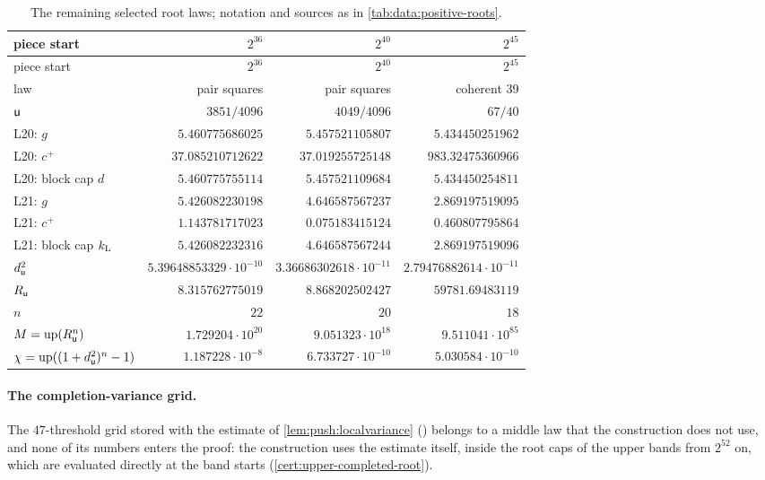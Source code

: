 {\scriptsize\setlength{\tabcolsep}{4pt}\renewcommand{\arraystretch}{0.95}
\begin{longtable}{@{}lrrr@{}}
\caption{The remaining selected root laws; notation and sources as in \cref{tab:data:positive-roots}.}\label{tab:data:positive-roots-late}\\
\toprule
piece start & $2^{36}$ & $2^{40}$ & $2^{45}$\\
\midrule\endfirsthead
\toprule
piece start & $2^{36}$ & $2^{40}$ & $2^{45}$\\
\midrule\endhead
\bottomrule\endfoot
law & pair squares & pair squares & coherent 39\\
$\mathsf u$ & $3851/4096$ & $4049/4096$ & $67/40$\\
L20: $g$ & $5.460775686025$ & $5.457521105807$ & $5.434450251962$\\
L20: $c^+$ & $37.085210712622$ & $37.019255725148$ & $983.32475360966$\\
L20: block cap $d$ & $5.460775755114$ & $5.457521109684$ & $5.434450254811$\\
L21: $g$ & $5.426082230198$ & $4.646587567237$ & $2.869197519095$\\
L21: $c^+$ & $1.143781717023$ & $0.075183415124$ & $0.460807795864$\\
L21: block cap $k_{\rm L}$ & $5.426082232316$ & $4.646587567244$ & $2.869197519096$\\
$d_\mathsf u^2$ & $5.39648853329\cdot10^{-10}$ & $3.36686302618\cdot10^{-11}$ & $2.79476882614\cdot10^{-11}$\\
$R_\mathsf u$ & $8.315762775019$ & $8.868202502427$ & $59781.69483119$\\
$n$ & $22$ & $20$ & $18$\\
$M=\operatorname{up}(R_\mathsf u^n)$ & $1.729204\cdot10^{20}$ & $9.051323\cdot10^{18}$ & $9.511041\cdot10^{85}$\\
$\chi=\operatorname{up}((1+d_\mathsf u^2)^n-1)$ & $1.187228\cdot10^{-8}$ & $6.733727\cdot10^{-10}$ & $5.030584\cdot10^{-10}$\\
\end{longtable}
}

\paragraph{The completion-variance grid.}
The $47$-threshold grid stored with the estimate of \cref{lem:push:localvariance}
() belongs to a
middle law that the construction does not use, and none of its numbers enters
the proof: the construction uses the estimate itself, inside the root caps of the
upper bands from $2^{52}$ on, which are evaluated directly at the band starts
(\cref{cert:upper-completed-root}).

